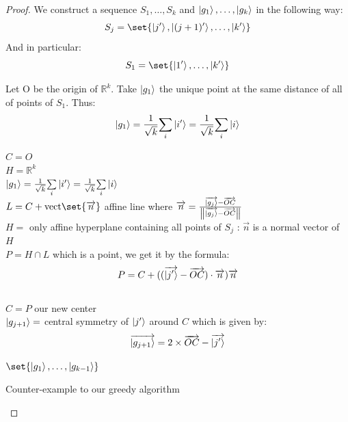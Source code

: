 \documentclass{article}
\theoremstyle{definition}
\theoremstyle{remark}
\begin{document}
\begin{proof}
     We construct a sequence $S_1,\ldots,S_k$ and $\ket{g_1},\ldots,\ket{g_k}$ in the following way:
     \[S_j = \set{\ket{j'},\ket{(j+1)'},\ldots,\ket{k'}}\]
     And in particular:
     \[S_1 = \set{\ket{1'},\ldots,\ket{k'}}\]
     
     Let O be the origin of $\mathbb{R}^k$. Take $\ket{g_1}$ the unique point at the same distance of all of points of $S_1$. Thus:
     \[\ket{g_1} = \frac{1}{\sqrt{k}}\underset{i}{\sum}\ket{i'} = \frac{1}{\sqrt{k}}\underset{i}{\sum}\ket{i}\]

     \begin{algorithm}[H]
      \DontPrintSemicolon
      $C = O$\\
      $H = \mathbb{R}^k$\\
      $\ket{g_1} = \frac{1}{\sqrt{k}}\underset{i}{\sum}\ket{i'} = \frac{1}{\sqrt{k}}\underset{i}{\sum}\ket{i}$\\
         {
           $L = C + \text{vect}\set{\overrightarrow{n}}$ affine line where $\overrightarrow{n} = \frac{\overrightarrow{\ket{g_j}} - \overrightarrow{OC}}{\norm{\overrightarrow{\ket{g_j}} - \overrightarrow{OC}}}$\\
           $H =$ only affine hyperplane containing all points of $S_j$ : $\overrightarrow{n}$ is a normal vector of $H$ \\
           $P = H \cap L$ which is a point, we get it by the formula:
           \[P = C + ((\overrightarrow{\ket{j'}} - \overrightarrow{OC}) \cdot \overrightarrow{n})\overrightarrow{n}\]
           \\
           $C = P$ our new center\\
           $\ket{g_{j+1}} = $ central symmetry of $\ket{j'}$ around $C$ which is given by:
           \[\overrightarrow{\ket{g_{j+1}}} = 2 \times \overrightarrow{OC}-\overrightarrow{\ket{j'}}\]
         }

         \Return $\set{\ket{g_1},\ldots,\ket{g_{k-1}}}$
         \caption{Counter-example to our greedy algorithm}
    \end{algorithm}


\end{proof}
\end{document}
